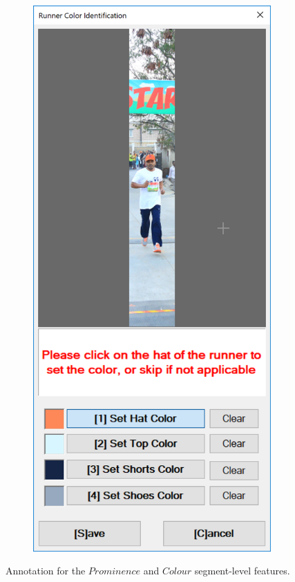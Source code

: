 \begin{figure}
\begin{subfigure}[b]{0.45\textwidth}
  \end{subfigure}
  \hspace{\fill}
  \begin{subfigure}[b]{0.45\textwidth}
    \includegraphics[width=\textwidth]{images/dataset/argus/argus_color_entry}
  \end{subfigure}
  \hspace{\fill}
  \caption[Prominence and Colour feature annotation with Argus]{Annotation for the $Prominence$ and $Colour$ segment-level features.}
  \label{fig:dataset:argus:prom_and_col}
\end{figure}